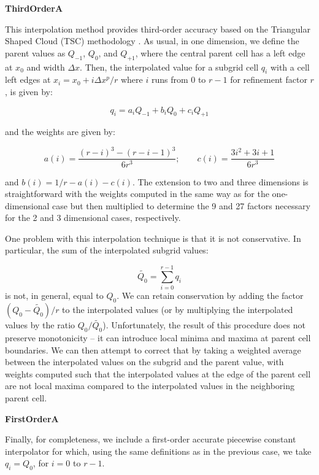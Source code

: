 
\vspace{0.3cm}\noindent
{\bf ThirdOrderA} 

This interpolation method provides third-order accuracy based on the
Triangular Shaped Cloud (TSC) methodology \citep{Hockney88}.  As
usual, in one dimension, we define the parent values as $Q_{-1}$,
$Q_0$, and $Q_{+1}$, where the central parent cell has a left edge at
$x_0$ and width $\Delta x$.  Then, the interpolated value for a
subgrid cell $q_i$ with a cell left edges at $x_i = x_0 + i \Delta
x^p/r$ where $i$ runs from 0 to $r-1$ for refinement factor $r$, is
given by:

\begin{equation}
q_i = a_i  Q_{-1} + b_i Q_0 + c_i Q_{+1}
\end{equation}

and the weights are given by:

\begin{equation}
a(i) =  \frac{(r-i)^3 - (r-i-1)^3}{6r^3}; \qquad c(i) = \frac{3i^2 + 3i + 1}{6r^3}
\end{equation}

and $b(i) = 1/r - a(i) - c(i)$.  The extension to two and three
dimensions is straightforward with the weights computed in the same
way as for the one-dimensional case but then multiplied to determine
the 9 and 27 factors necessary for the 2 and 3 dimensional cases,
respectively.

One problem with this interpolation technique is that it is not
conservative.  In particular, the sum of the interpolated subgrid
values:

\begin{equation}
\tilde{Q_0} = \sum_{i=0}^{r-1} q_i
\end{equation}
is not, in general, equal to $Q_0$.  We can retain conservation by
adding the factor $(Q_0 - \tilde{Q_0})/r$ to the interpolated values
(or by multiplying the interpolated values by the ratio
$Q_0/\tilde{Q_0}$).  Unfortunately, the result of this procedure does
not preserve monotonicity -- it can introduce local minima and maxima
at parent cell boundaries.  We can then attempt to correct that by
taking a weighted average between the interpolated values on the
subgrid and the parent value, with weights computed such that the
interpolated values at the edge of the parent cell are not local
maxima compared to the interpolated values in the neighboring parent
cell.



\vspace{0.3cm}\noindent
{\bf FirstOrderA}

Finally, for completeness, we include a first-order accurate piecewise
constant interpolator for which, using the same definitions as in the
previous case, we take $q_i = Q_0$, for $i = 0$ to $r-1$. 

\vspace{1cm}


